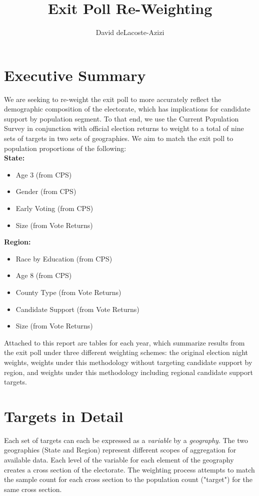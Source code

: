 \documentclass[12pt]{article}
\title{Exit Poll Re-Weighting}
\author{David deLacoste-Azizi}
\date{}
\begin{document}
\section{Executive Summary}
We are seeking to re-weight the exit poll to more accurately reflect the demographic composition of the electorate, which has implications for candidate support by population segment. To that end, we use the Current Population Survey in conjunction with official election returns to weight to a total of nine sets of targets in two sets of geographies. We aim to match the exit poll to population proportions of the following:\\

\noindent\textbf{State:}\begin{itemize}
\item Age 3 (from CPS)
\item Gender (from CPS)
\item Early Voting (from CPS)
\item Size (from Vote Returns)
\end{itemize}
\textbf{Region:}\begin{itemize}
\item Race by Education (from CPS)
\item Age 8 (from CPS)
\item County Type (from Vote Returns)
\item Candidate Support (from Vote Returns)
\item Size (from Vote Returns)
\end{itemize}

Attached to this report are tables for each year, which summarize results from the exit poll under three different weighting schemes: the original election night weights, weights under this methodology without targeting candidate support by region, and weights under this methodology including regional candidate support targets. 

\section{Targets in Detail}
	
Each set of targets can each be expressed as a \emph{variable} by a \emph{geography}. The two geographies (State and Region) represent different scopes of aggregation for available data. Each level of the variable for each element of the geography creates a cross section of the electorate. The weighting process attempts to match the sample count for each cross section to the population count ("target") for the same cross section.
\end{document}
